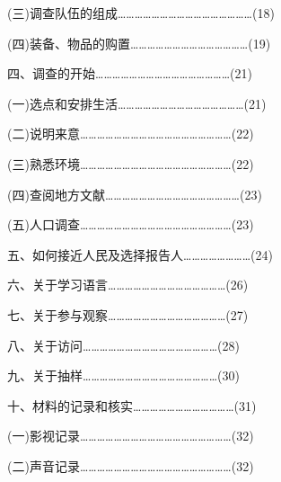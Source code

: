 \documentclass[12pt,a4paper]{article}
\begin{document}
\noindent\hspace{2.5em}(三)调查队伍的组成…………………………………………(18)

\noindent\hspace{2.5em}(四)装备、物品的购置……………………………………(19)



\noindent\hspace{1em}四、调查的开始…………………………………………(21)



\noindent\hspace{2.5em}(一)选点和安排生活………………………………………(21)

\noindent\hspace{2.5em}(二)说明来意………………………………………………(22)

\noindent\hspace{2.5em}(三)熟悉环境………………………………………………(22)

\noindent\hspace{2.5em}(四)查阅地方文献…………………………………………(23)

\noindent\hspace{2.5em}(五)人口调查………………………………………………(23)



\noindent\hspace{1em}五、如何接近人民及选择报告人……………………(24)



\noindent\hspace{1em}六、关于学习语言……………………………………(26)



\noindent\hspace{1em}七、关于参与观察……………………………………(27)



\noindent\hspace{1em}八、关于访问…………………………………………(28)



\noindent\hspace{1em}九、关于抽样…………………………………………(30)



\noindent\hspace{1em}十、材料的记录和核实………………………………(31)



\noindent\hspace{2.5em}(一)影视记录………………………………………………(32)

\noindent\hspace{2.5em}(二)声音记录………………………………………………(32)
\end{document}
